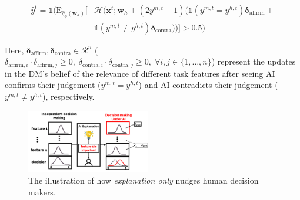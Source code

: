 \documentclass[letterpaper]{article} %
\begin{document}
\begin{small}
    \begin{equation}
\begin{split}
    \hat{y}^{t} =  \mathds{1}( \mathrm{E}_{\hat{q}_{\phi}(\bm{w}_h)}  [ &\mathcal{H}(\bm{x}^t;\bm{w}_h + 
     (2y^{m,t} -1) (\mathds{1}(y^{m,t} = y^{h,t})\bm{\delta}_{\text{affirm}}+\\
     &\mathds{1}(y^{m,t} \neq y^{h,t})\bm{\delta}_{\text{contra}}))]>0.5)
\end{split}
\end{equation}
\end{small}
\noindent Here, \( \bm{\delta}_{\text{affirm}}, \bm{\delta}_{\text{contra}} \in \mathcal{R}^n \) ($ \delta_{\text{affirm},i} \cdot \delta_{\text{affirm},j} \geq 0, \; \delta_{\text{contra},i} \cdot \delta_{\text{contra},j} \geq 0, \; \forall i, j \in \{1, \dots, n\}$) represent the updates in the DM's belief of the relevance of different task features after seeing AI confirms their judgement ($y^{m,t} = y^{h,t}$) and AI contradicts their judgement ($y^{m,t} \neq y^{h,t}$), respectively.
\begin{figure}[ht]
    \centering
        \includegraphics[width=0.48\textwidth]{figures/ai_exp.png}
    \caption{The illustration of how \emph{explanation only} nudges human decision makers. 
    }
    \label{fig:ill_exp}
\end{figure}
\end{document}
